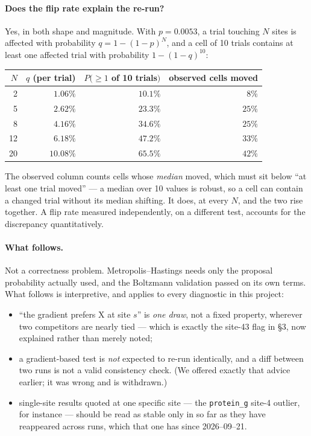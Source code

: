 \documentclass[11pt,a4paper]{article}
\begin{document}
\paragraph{Does the flip rate explain the re-run?} Yes, in both shape and
magnitude. With $p = 0.0053$, a trial touching $N$ sites is affected with
probability $q = 1-(1-p)^{N}$, and a cell of 10 trials contains at least one
affected trial with probability $1-(1-q)^{10}$:

\begin{center}
\begin{tabular}{r r r r}
\toprule
$N$ & $q$ (per trial) & $P(\ge 1$ of 10 trials$)$ & observed cells moved \\
\midrule
 2 & $1.06\%$  & $10.1\%$ & $8\%$  \\
 5 & $2.62\%$  & $23.3\%$ & $25\%$ \\
 8 & $4.16\%$  & $34.6\%$ & $25\%$ \\
12 & $6.18\%$  & $47.2\%$ & $33\%$ \\
20 & $10.08\%$ & $65.5\%$ & $42\%$ \\
\bottomrule
\end{tabular}
\end{center}

\noindent
The observed column counts cells whose \emph{median} moved, which must sit
below ``at least one trial moved'' --- a median over 10 values is robust, so a
cell can contain a changed trial without its median shifting. It does, at
every $N$, and the two rise together. A flip rate measured independently, on
a different test, accounts for the discrepancy quantitatively.

\paragraph{What follows.} Not a correctness problem.
Metropolis--Hastings needs only the proposal probability actually used, and
the Boltzmann validation passed on its own terms. What follows is
interpretive, and applies to every diagnostic in this project:

\begin{itemize}\itemsep2pt
  \item ``the gradient prefers X at site $s$'' is \emph{one draw}, not a fixed
        property, wherever two competitors are nearly tied --- which is
        exactly the site-43 flag in §3, now explained rather than merely
        noted;
  \item a gradient-based test is \emph{not} expected to re-run identically,
        and a diff between two runs is not a valid consistency check. (We
        offered exactly that advice earlier; it was wrong and is withdrawn.)
  \item single-site results quoted at one specific site --- the
        \texttt{protein\_g} site-4 outlier, for instance --- should be read as
        stable only in so far as they have reappeared across runs, which that
        one has since 2026--09--21.
\end{itemize}
\end{document}
